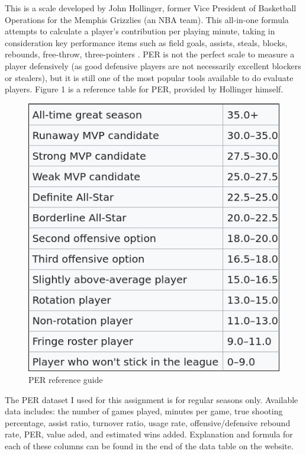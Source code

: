 \documentclass[a4paper,12pt,twoside]{article}
\numberwithin{equation}{section}
\begin{document}
This is a scale developed by John Hollinger, former Vice President of Basketball Operations for the Memphis Grizzlies (an NBA team). This all-in-one formula attempts to calculate a player's contribution per playing minute, taking in consideration key performance items such as field goals, assists, steals, blocks, rebounds, free-throw, three-pointers \cite{wiper}. PER is not the perfect scale to measure a player defensively (as good defensive players are not necessarily excellent blockers or stealers), but it is still one of the most popular tools available to do evaluate players. Figure 1 is a reference table for PER, provided by Hollinger himself.

\begin{figure}[h!]
\caption{PER reference guide}
\includegraphics[scale=0.5]{hop.jpg}
\centering
\end{figure}

The PER dataset I used for this assignment is for regular seasons only. Available data includes: the number of games played, minutes per game, true shooting percentage, assist ratio, turnover ratio, usage rate, offensive/defensive rebound rate, PER, value aded, and estimated wins added. Explanation and formula for each of these columns can be found in the end of the data table on the website.
\end{document}
